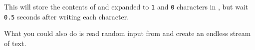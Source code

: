This will store the contents of  and
 expanded to \verb|1| and \verb|0| characters in
, but wait \verb|0.5| seconds after writing
each character.

What you could also do is read random input from 
and create an endless stream of text.



\osueguidelinesone


